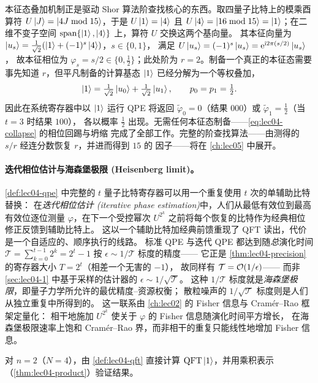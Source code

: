 \begin{example}
\label{exa:lec04-order}
本征态叠加机制正是驱动 Shor 算法阶查找核心的东西。取四量子比特上的模乘酉算符
$U\ket{J}=\ket{4J\bmod 15}$，于是 $U\ket{1}=\ket{4}$ 且
$U\ket{4}=\ket{16\bmod 15}=\ket{1}$；在二维不变子空间
$\mathrm{span}\{\ket{1},\ket{4}\}$ 上，算符 $U$ 交换这两个基向量。
其本征向量为 $\ket{u_s}=\tfrac{1}{\sqrt2}(\ket{1}+(-1)^{s}\ket{4})$，$s\in\{0,1\}$，
满足 $U\ket{u_s}=(-1)^{s}\ket{u_s}=\mathrm{e}^{\mathrm{i} 2\pi(s/2)}\ket{u_s}$，
故本征相位为 $\varphi_s=s/2\in\{0,\tfrac12\}$；此处阶为
$r=2$。制备一个真正的本征态需要事先知道 $r$，但平凡制备的计算基态 $\ket{1}$
已经分解为一个等权叠加，
\[
  \ket{1}=\tfrac{1}{\sqrt2}\ket{u_0}+\tfrac{1}{\sqrt2}\ket{u_1},
  \qquad p_0=p_1=\tfrac12.
\]
因此在系统寄存器中以 $\ket{1}$ 运行 QPE 将返回
$\tilde\varphi_0=0$（结果 $000$）或 $\tilde\varphi_1=\tfrac12$（当 $t=3$ 时结果 $100$），
各以概率 $\tfrac12$ 出现。无需任何本征态制备——\cref{eq:lec04-collapse} 的相位回踢与坍缩
完成了全部工作。完整的阶查找算法——由测得的 $s/r$ 经连分数恢复 $r$，并进而得到 $15$ 的
因子——将在 \cref{ch:lec05} 中展开。
\end{example}

\paragraph{迭代相位估计与海森堡极限 (Heisenberg limit)。}
\cref{def:lec04-qpe} 中完整的 $t$ 量子比特寄存器可以用一个重复使用 $t$ 次的单辅助比特替换：
在\emph{迭代相位估计 (iterative phase estimation)}中，人们从最低有效位到最高有效位逐位测量
$\varphi$，在下一个受控幂次 $U^{2^{k}}$ 之前将每个恢复的比特作为经典相位修正反馈到辅助比特上。
这以一个辅助比特加经典前馈重现了 QFT 读出，代价是一个自适应的、顺序执行的线路。
标准 QPE 与迭代 QPE 都达到随\emph{总}演化时间
$\mathcal{T}=\sum_{k=0}^{t-1} 2^{k}=2^{t}-1$ 按 $\epsilon\sim1/\mathcal{T}$ 标度的精度——
它正是 \cref{thm:lec04-precision} 的寄存器大小 $T=2^{t}$（相差一个无害的 $-1$），
故同样有 $\mathcal{T}=\mathcal{O}(1/\epsilon)$——
而非 \cref{sec:lec04-1} 中基于采样的估计器的 $\epsilon\sim1/\sqrt{\mathcal{T}}$。
这种 $1/\mathcal{T}$ 标度就是\emph{海森堡极限}，即量子力学所允许的最优精度–资源权衡；
散粒噪声的 $1/\sqrt{\mathcal{T}}$ 标度则是人们从独立重复中所得到的。
这一联系由 \cref{ch:lec02} 的 Fisher 信息与 Cram\'er--Rao 框架定量化：
相干地施加 $U^{2^{k}}$ 使关于 $\varphi$ 的 Fisher 信息随演化时间平方增长，
在海森堡极限速率上饱和 Cram\'er--Rao 界，而非相干的重复只能线性地增加 Fisher 信息。

\exercisesection
\begin{exercise}\label{ex:lec04-1}
对 $n=2$（$N=4$），由 \cref{def:lec04-qft} 直接计算 $\mathrm{QFT}\ket{1}$，并用乘积表示
（\cref{thm:lec04-product}）验证结果。
\end{exercise}

